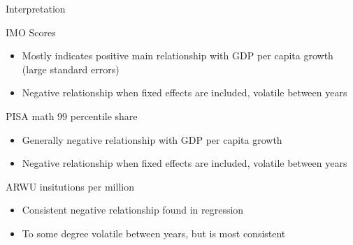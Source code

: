 \documentclass[10pt]{beamer}
\begin{document}
\begin{frame}{Interpretation}
    \begin{block}{IMO Scores}
        \begin{itemize}
            \item Mostly indicates positive main relationship with GDP per capita growth (large standard errors)
            \item Negative relationship when fixed effects are included, volatile between years
        \end{itemize}
    \end{block}

    \begin{block}{PISA math 99 percentile share}
        \begin{itemize}
            \item Generally negative relationship with GDP per capita growth
            \item Negative relationship when fixed effects are included, volatile between years
        \end{itemize}
    \end{block}

    \begin{block}{ARWU insitutions per million}
        \begin{itemize}
            \item Consistent negative relationship found in regression
            \item To some degree volatile between years, but is most consistent
        \end{itemize}
    \end{block}
    
\end{frame}
\end{document}

